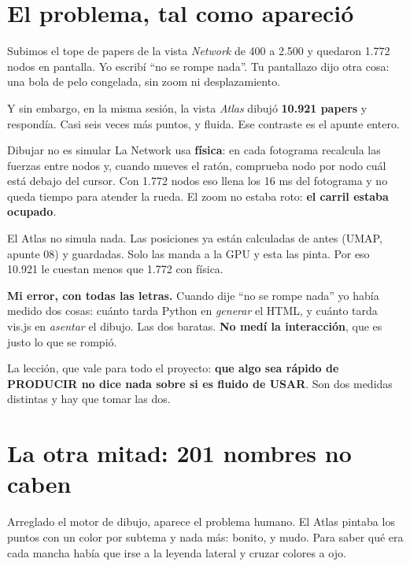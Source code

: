 \documentclass[11pt,a4paper]{article}
\begin{document}
\section{El problema, tal como apareció}

Subimos el tope de papers de la vista \emph{Network} de 400 a 2.500 y quedaron 1.772
nodos en pantalla. Yo escribí ``no se rompe nada''. Tu pantallazo dijo otra cosa: una
bola de pelo congelada, sin zoom ni desplazamiento.

Y sin embargo, en la misma sesión, la vista \emph{Atlas} dibujó \textbf{10.921 papers} y
respondía. Casi seis veces más puntos, y fluida. Ese contraste es el apunte entero.

\begin{concepto}{Dibujar no es simular}
La Network usa \textbf{física}: en cada fotograma recalcula las fuerzas entre nodos y,
cuando mueves el ratón, comprueba nodo por nodo cuál está debajo del cursor. Con 1.772
nodos eso llena los 16 ms del fotograma y no queda tiempo para atender la rueda. El zoom
no estaba roto: \textbf{el carril estaba ocupado}.

El Atlas no simula nada. Las posiciones ya están calculadas de antes (UMAP, apunte 08) y
guardadas. Solo las manda a la GPU y esta las pinta. Por eso 10.921 le cuestan menos que
1.772 con física.
\end{concepto}

\begin{ojo}
\textbf{Mi error, con todas las letras.} Cuando dije ``no se rompe nada'' yo había medido dos cosas: cuánto tarda Python en
\emph{generar} el HTML, y cuánto tarda vis.js en \emph{asentar} el dibujo. Las dos
baratas. \textbf{No medí la interacción}, que es justo lo que se rompió.

La lección, que vale para todo el proyecto: \textbf{que algo sea rápido de PRODUCIR no
dice nada sobre si es fluido de USAR}. Son dos medidas distintas y hay que tomar las dos.
\end{ojo}

\section{La otra mitad: 201 nombres no caben}

Arreglado el motor de dibujo, aparece el problema humano. El Atlas pintaba los puntos con
un color por subtema y nada más: bonito, y mudo. Para saber qué era cada mancha había que
irse a la leyenda lateral y cruzar colores a ojo.
\end{document}
